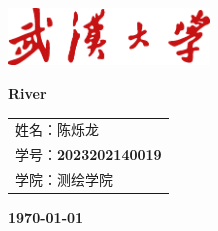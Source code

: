\documentclass[12pt, onecolumn]{article}
\title{\normf{编程：观测值逐次更新的扩展卡尔曼滤波器}}
\author{\normf 姓名：陈烁龙\;\;\;学号：2023202140019\;\;\;学院：测绘学院}
\date{\normf{\today}}
\begin{document}
	\begin{titlepage}
	    \centering
	    \includegraphics[width=0.4\textwidth]{whu_red.png}\par\vspace{1cm}
	    \vspace{4cm}
	    {\huge\bfseries River \par}
	    \vspace{3cm}
	    {\Large\kaishu 
	    \begin{center}\begin{tabular}{l}
	    姓名：陈烁龙\\
	    学号：\bfseries 2023202140019\\
	    学院：测绘学院
	    \end{tabular}\end{center}
	     \par}
	    
	
	    \vfill
	
	    {\large\kaishu\bfseries \today\par}
	\end{titlepage}
 		\thispagestyle{empty}
		\clearpage
		
		\tableofcontents
		\newpage
		\listoffigures
		\newpage
		\listoftables
		
		\clearpage
		\setcounter{page}{1}
		
\end{document}
